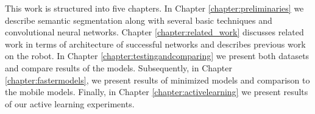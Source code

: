 This work is structured into five chapters. In Chapter \ref{chapter:preliminaries} we
describe semantic segmentation along with several basic techniques and convolutional
neural networks. Chapter \ref{chapter:related_work} discusses related work in terms
of architecture of successful networks and describes previous work on the robot. 
In Chapter \ref{chapter:testingandcomparing} we present both datasets and compare
results of the models. Subsequently, in Chapter \ref{chapter:fastermodels}, we present
results of minimized models and comparison to the mobile models.
Finally, in Chapter \ref{chapter:activelearning} we present results of our active learning
experiments.
